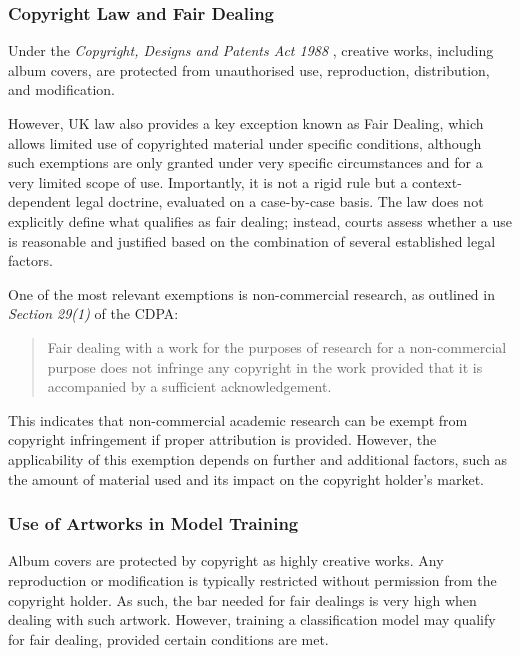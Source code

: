               \subsubsection{Copyright Law and Fair Dealing}
                  Under the \textit{Copyright, Designs and Patents Act 1988} \cite{cdpa1988}, creative works, including album covers, are protected from unauthorised use, reproduction, distribution, and modification.
          
                  However, UK law also provides a key exception known as Fair Dealing, which allows limited use of copyrighted material under specific conditions, although such exemptions are only granted under very specific circumstances and for a very limited scope of use. Importantly, it is not a rigid rule but a context-dependent legal doctrine, evaluated on a case-by-case basis. The law does not explicitly define what qualifies as fair dealing; instead, courts assess whether a use is reasonable and justified based on the combination of several established legal factors.
                  
                  One of the most relevant exemptions is non-commercial research, as outlined in \textit{Section 29(1)} of the CDPA:
                  \begin{quote}
                      Fair dealing with a work for the purposes of research for a non-commercial purpose does not infringe any copyright in the work provided that it is accompanied by a sufficient acknowledgement. \cite{cdpa1988}
                  \end{quote}
    
                  This indicates that non-commercial academic research can be exempt from copyright infringement if proper attribution is provided. However, the applicability of this exemption depends on further and additional factors, such as the amount of material used and its impact on the copyright holder’s market.
    
              \subsubsection{Use of Artworks in Model Training}
              
                  Album covers are protected by copyright as highly creative works. Any reproduction or modification is typically restricted without permission from the copyright holder. As such, the bar needed for fair dealings is very high when dealing with such artwork. However, training a classification model may qualify for fair dealing, provided certain conditions are met.
    
